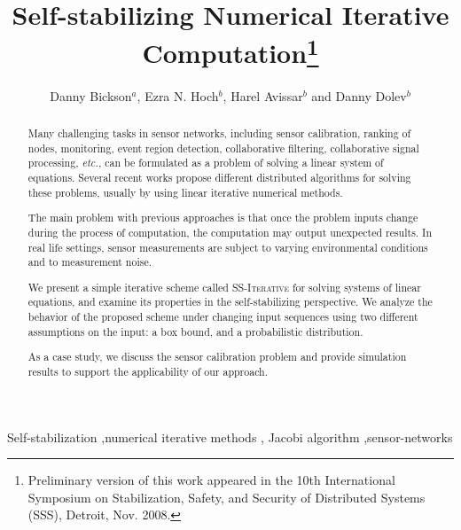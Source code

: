 \documentclass[preprint,12pt]{elsarticle}
\newcommand{\syncAlg}{\textsc{SS-Iterative}\xspace}
\begin{document}
\begin{frontmatter}






\title{Self-stabilizing Numerical Iterative Computation\footnote{Preliminary version of this work appeared
in the 10th International Symposium on Stabilization, Safety, and Security of Distributed Systems (SSS), Detroit, Nov. 2008.}}




\author{Danny Bickson$^a$, Ezra N. Hoch$^b$, Harel Avissar$^b$ and Danny Dolev$^b$}



\address[IBM]{
IBM Haifa Research Lab\\
Mount Carmel\\Haifa 31905, Israel\\
Email: \{dannybi\}@il.ibm.com\\
}
\address[HUJI]{School of Computer Science and Engineering\\
The Hebrew University of Jerusalem\\
Jerusalem 91904, Israel\\
Email: \{hoch,harela01,dolev\}@cs.huji.ac.il\\
}






\begin{abstract}
Many challenging tasks in sensor networks, including sensor
calibration, ranking of nodes, monitoring, event region detection,
collaborative filtering, collaborative signal processing, {\em etc.}, can
be formulated as a problem of solving a linear system of
equations. Several recent works propose different distributed
algorithms for solving these problems, usually by using linear iterative numerical
methods.

The main problem with previous approaches is that once the problem inputs
change during the process of computation, the computation may output unexpected results.
In real life settings, sensor measurements are subject to
varying environmental conditions and to measurement noise.

We present a simple iterative scheme called \syncAlg for solving
systems of linear equations, and examine its properties in the self-stabilizing
perspective. We analyze the behavior of the proposed scheme under changing input sequences using two different assumptions on the input: a box bound, and a probabilistic distribution.


As a case study, we discuss the sensor calibration problem and
provide simulation results to support the applicability of our
approach.
\end{abstract}

\begin{keyword}
Self-stabilization \sep numerical iterative methods \sep
Jacobi algorithm \sep sensor-networks






\end{keyword}

\end{frontmatter}
\end{document}
